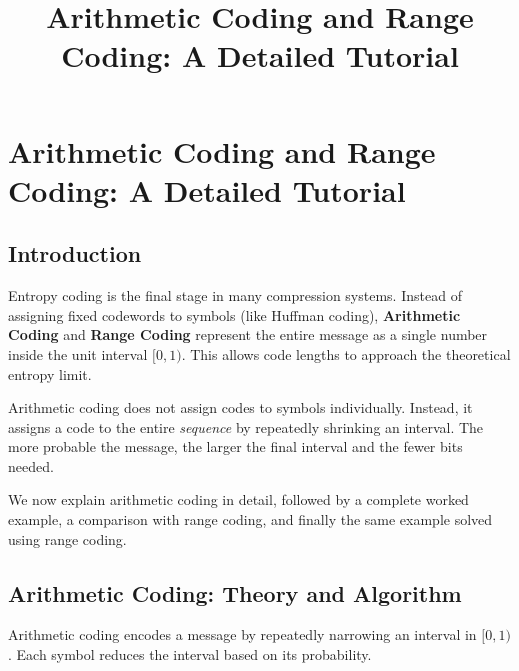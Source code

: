 \documentclass[12pt]{article}
\title{Arithmetic Coding and Range Coding: A Detailed Tutorial}
\author{}
\date{}
\begin{document}
\maketitle

\section{Arithmetic Coding and Range Coding: A Detailed Tutorial}

\subsection{Introduction}

Entropy coding is the final stage in many compression systems.
Instead of assigning fixed codewords to symbols (like Huffman coding),
\textbf{Arithmetic Coding} and \textbf{Range Coding} represent the entire
message as a single number inside the unit interval $[0,1)$.
This allows code lengths to approach the theoretical entropy limit.

\begin{tcolorbox}[colback=blue!3,colframe=blue!40!black,title=Key Idea]
Arithmetic coding does not assign codes to symbols individually.
Instead, it assigns a code to the entire \textit{sequence} by repeatedly shrinking an interval.
The more probable the message, the larger the final interval and the fewer bits needed.
\end{tcolorbox}

We now explain arithmetic coding in detail, followed by a complete worked
example, a comparison with range coding, and finally the same example solved
using range coding.

\subsection{Arithmetic Coding: Theory and Algorithm}

Arithmetic coding encodes a message by repeatedly narrowing an interval in $[0,1)$.
Each symbol reduces the interval based on its probability.
\end{document}
